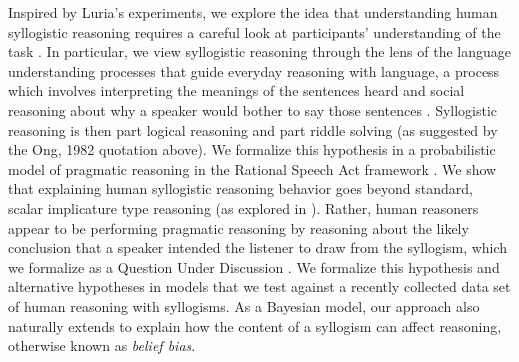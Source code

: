 \documentclass[floatsintext, doc]{apa6}
\begin{document}

Inspired by Luria's experiments, we explore the idea that understanding human syllogistic reasoning requires a careful look at participants' understanding of the task \cite{henle1962relation}. 
In particular, we view syllogistic reasoning through the lens of the language understanding processes that guide everyday reasoning with language, a process which involves interpreting the meanings of the sentences heard and social reasoning about why a speaker would bother to say those sentences \cite{Grice1975, Clark1996, Levinson2000}. 
Syllogistic reasoning is then part logical reasoning and part riddle solving (as suggested by the Ong, 1982 quotation above).
We formalize this hypothesis in a probabilistic model of pragmatic reasoning in the Rational Speech Act framework \cite{Frank2012a, goodman2016pragmatic}.
We show that explaining human syllogistic reasoning behavior goes beyond standard, scalar implicature type reasoning  (as explored in ).
Rather, human reasoners appear to be performing pragmatic reasoning by reasoning about the likely conclusion that a speaker intended the listener to draw from the syllogism, which we formalize as a Question Under Discussion \cite{Roberts2004QUD}.
We formalize this hypothesis and alternative hypotheses in models that we test against a recently collected data set of human reasoning with syllogisms. 
As a Bayesian model, our approach also naturally extends to explain how the content of a syllogism can affect reasoning, otherwise known as \emph{belief bias}. 

%
%
\end{document}
